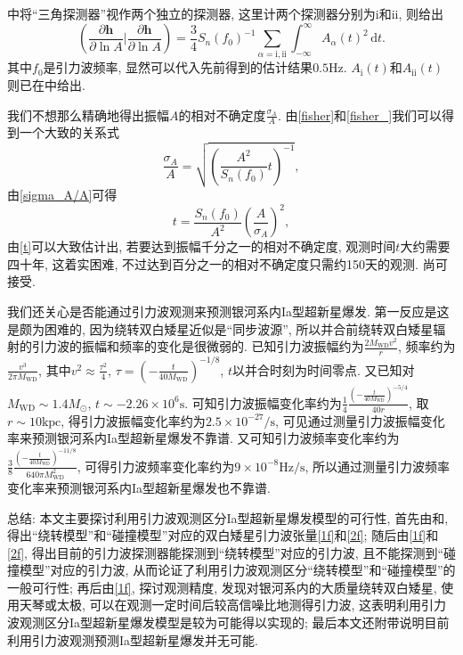\documentclass[12pt]{ctexart}
\def\b{\boldsymbol}
\def\d{\mathrm{d}}
\def\p{\partial}
\begin{document}
\cite{Cutler1998}中将``三角探测器''视作两个独立的探测器, 这里计两个探测器分别为$\text{i}$和$\text{ii}$, 则\cite{Cutler1998}给出
\begin{equation}
    \left(\frac{\p \b{h}}{\p \ln A}\Big|\frac{\p \b{h}}{\p \ln A}\right)
    =\frac{3}{4}S_n(f_0)^{-1}\sum_{\alpha=\text{i},\text{ii}}\int_{-\infty}^{\infty}A_\alpha(t)^2\,\d t.\label{fisher_}
\end{equation}
其中$f_0$是引力波频率, 显然可以代入先前得到的估计结果$0.5\text{Hz}$. $A_\text{i}(t)$和$A_\text{ii}(t)$则已在\cite{Cutler1998}中给出.

我们不想那么精确地得出振幅$A$的相对不确定度$\frac{\sigma_A}{A}$. 由\eqref{fisher}和\eqref{fisher_}我们可以得到一个大致的关系式
\begin{equation}
    \frac{\sigma_A}{A}=\sqrt{\left(\frac{A^2}{S_n(f_0)}t\right)^{-1}},\label{sigma_A/A}
\end{equation}
由\eqref{sigma_A/A}可得
\begin{equation}
    t=\frac{S_n(f_0)}{A^2}\left(\frac{A}{\sigma_A}\right)^2,\label{t}
\end{equation}
由\eqref{t}可以大致估计出, 若要达到振幅千分之一的相对不确定度, 观测时间$t$大约需要四十年, 这着实困难, 不过达到百分之一的相对不确定度只需约150天的观测. 尚可接受.

我们还关心是否能通过引力波观测来预测银河系内Ia型超新星爆发. 第一反应是这是颇为困难的, 因为绕转双白矮星近似是``同步波源'', 所以并合前绕转双白矮星辐射的引力波的振幅和频率的变化是很微弱的. 已知引力波振幅约为$\frac{2M_\text{WD}v^2}{r}$, 频率约为$\frac{v^3}{2\pi M_\text{WD}}$, 其中$v^2\approx\frac{\tau^2}{4}$, $\tau=(-\frac{t}{40M_\text{WD}})^{-1/8}$, $t$以并合时刻为时间零点. 又已知对$M_\text{WD}\sim1.4M_\odot$, $t\sim-2.26\times10^6\text{s}$. 可知引力波振幅变化率约为$\frac{1}{4}\frac{(-\frac{t}{40M_\text{WD}})^{-5/4}}{40r}$, 取$r\sim10\text{kpc}$, 得引力波振幅变化率约为$2.5\times10^{-27}/\text{s}$, 可见通过测量引力波振幅变化率来预测银河系内Ia型超新星爆发不靠谱. 又可知引力波频率变化率约为$\frac{3}{8}\frac{(-\frac{t}{40M_\text{WD}})^{-11/8}}{640\pi M_\text{WD}^2}$, 可得引力波频率变化率约为$9\times10^{-8}\text{Hz}/\text{s}$, 所以通过测量引力波频率变化率来预测银河系内Ia型超新星爆发也不靠谱.

总结: 本文主要探讨利用引力波观测区分Ia型超新星爆发模型的可行性, 首先由\cite{Wald1984}和\cite{Sathyaprakash2009}, 得出``绕转模型''和``碰撞模型''对应的双白矮星引力波张量\eqref{1f}和\eqref{2f}; 随后由\eqref{1f}和\eqref{2f}, 得出目前的引力波探测器能探测到``绕转模型''对应的引力波, 且不能探测到``碰撞模型''对应的引力波, 从而论证了利用引力波观测区分``绕转模型''和``碰撞模型''的一般可行性; 再后由\eqref{1f}, 探讨观测精度, 发现对银河系内的大质量绕转双白矮星, 使用天琴或太极, 可以在观测一定时间后较高信噪比地测得引力波, 这表明利用引力波观测区分Ia型超新星爆发模型是较为可能得以实现的; 最后本文还附带说明目前利用引力波观测预测Ia型超新星爆发并无可能.



\end{document}
